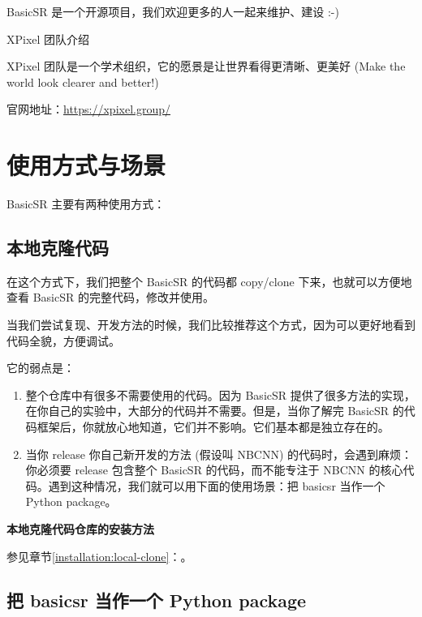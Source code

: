\documentclass[../main.tex]{subfiles}
\begin{document}
BasicSR 是一个开源项目，我们欢迎更多的人一起来维护、建设 :-)

\begin{exampleBox}[]{XPixel 团队介绍}

    XPixel 团队是一个学术组织，它的愿景是让世界看得更清晰、更美好 (Make the world look clearer and better!)

    官网地址：\url{https://xpixel.group/}
\end{exampleBox}

\section{使用方式与场景}
\label{overview:scenario}
BasicSR 主要有两种使用方式：

\subsection{本地克隆代码}

在这个方式下，我们把整个 BasicSR 的代码都 copy/clone 下来，也就可以方便地查看 BasicSR 的完整代码，修改并使用。

当我们尝试复现、开发方法的时候，我们比较推荐这个方式，因为可以更好地看到代码全貌，方便调试。

它的弱点是：

\begin{enumerate}
    \item 整个仓库中有很多不需要使用的代码。因为 BasicSR 提供了很多方法的实现，在你自己的实验中，大部分的代码并不需要。但是，当你了解完 BasicSR 的代码框架后，你就放心地知道，它们并不影响。它们基本都是独立存在的。
    \item 当你 release 你自己新开发的方法 (假设叫 NBCNN) 的代码时，会遇到麻烦：你必须要 release 包含整个 BasicSR 的代码，而不能专注于 NBCNN 的核心代码。遇到这种情况，我们就可以用下面的使用场景：把 basicsr 当作一个 Python package。
\end{enumerate}

\begin{note} %
    \textbf{本地克隆代码仓库的安装方法}

    参见章节\ref{installation:local-clone}：。
\end{note}

\subsection{把 basicsr 当作一个 Python package}
\end{document}
